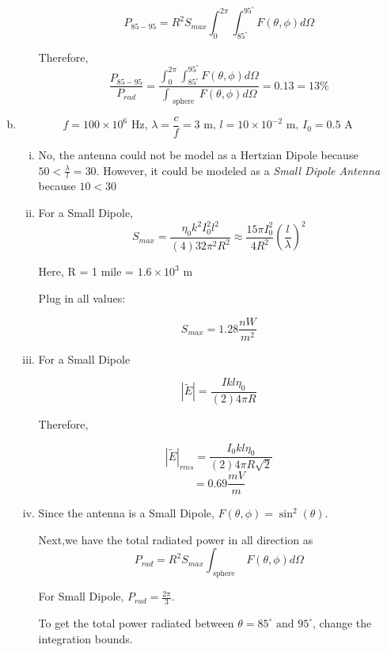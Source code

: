 \documentclass{article} %
\begin{document}
\begin{enumerate}[(a)]
\begin{enumerate}[(i)]
                    \[P_{85-95} = R^2 S_{max}\int_{0}^{2\pi} \int_{85^{\circ}}^{95^{\circ}}  F(\theta, \phi) d\Omega\]

                    Therefore,
                    \[\frac{P_{85-95}}{P_{rad}} = \frac{\int_{0}^{2\pi} \int_{85^{\circ}}^{95^{\circ}}  F(\theta, \phi) d\Omega}{\int_{\text{ sphere }}  F(\theta, \phi) d\Omega} = 0.13 = \boxed{13 \%}\]
          \end{enumerate}
    \item
          \[f = 100 \times 10^6 \text{ Hz, } \lambda = \frac{c}{f} = 3 \text{ m, } l = 10 \times 10^{-2} \text{ m, } I_0 = 0.5 \text{ A }\]
          \begin{enumerate}[(i)]
              \item $\boxed{\text{No}}$, the antenna could not be model as a Hertzian Dipole because $50 < \frac{\lambda}{l} = 30$. However, it could be modeled as a \textit{Small Dipole Antenna} because $10 < 30$
              \item For a Small Dipole,
                    \[S_{max} = \frac{\eta_0 k^2 I_0 ^2 l^2}{(4)32 \pi^2 R^2} \approx \frac{15 \pi I_0 ^2}{4R^2}\left(\frac{l}{\lambda}\right)^2\]

                    Here, R = 1 mile = $1.6 \times 10^3 \text{ m}$

                    Plug in all values:

                    \[\boxed{S_{max} = 1.28 \si{\frac{nW}{m^2}}}\]
              \item
                    For a Small Dipole

                    \[|\widetilde{E}| = \frac{I k l \eta_0}{(2)4 \pi R}\]

                    Therefore,

                    \[|\widetilde{E}|_{rms} = \frac{I_0 k l \eta_0}{(2)4 \pi R \sqrt{2}}\]
                    \[= \boxed{0.69 \si{\frac{mV}{m}}}\]
              \item
                    Since the antenna is a Small Dipole, $F(\theta, \phi) = \sin^2(\theta)$.

                    Next,we have the total radiated power in all direction as
                    \[P_{rad} = R^2 S_{max}\int_{\text{ sphere }}  F(\theta, \phi) d\Omega\]

                    For Small Dipole, $P_{rad} = \frac{2 \pi}{3}$.

                    To get the total power radiated between $\theta = 85^{\circ} \text{ and } 95^{\circ}$, change the integration bounds.


\end{enumerate}
\end{enumerate}
\end{document}
